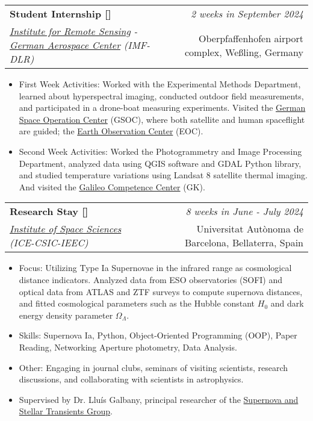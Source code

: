 \documentclass[a4paper,11pt]{article}
\makeatletter
\newcommand{\resumeSubheading}[4]{
\vspace{0.5mm}\item
    \begin{tabular*}{0.98\textwidth}[t]{l@{\extracolsep{\fill}}r}
        \textbf{#1} & \textit{\footnotesize{#4}} \\
        \textit{\footnotesize{#3}} &  \footnotesize{#2}\\
    \end{tabular*}
    \vspace{-2.4mm}
}
\newcommand{\resumeItemListStart}{\begin{itemize}[leftmargin=*,labelsep=1mm,itemsep=0.5mm]}
\newcommand{\resumeItemListEnd}{\end{itemize}\vspace{-2mm}}
\makeatother
\begin{document}
{  \resumeSubheading
      {{Student Internship [\href{https://github.com/joanalnu/thermal_analysis}{\faIcon{globe}}]}}{Oberpfaffenhofen airport complex, Weßling, Germany}
      {\href{https://www.dlr.de/de/eoc/ueber-uns/institut-fuer-methodik-der-fernerkundung}{Institute for Remote Sensing} - \href{https://dlr.de}{German Aerospace Center} (IMF-DLR)}{2 weeks in September 2024}
      \resumeItemListStart
        \item First Week Activities: Worked with the Experimental Methods Department, learned about hyperspectral imaging, conducted outdoor field measurements, and participated in a drone-boat measuring experiments. Visited the \href{https://www.dlr.de/en/rb}{German Space Operation Center} (GSOC), where both satellite and human spaceflight are guided; the \href{https://www.dlr.de/en/eoc}{Earth Observation Center} (EOC).
        \item Second Week Activities: Worked the Photogrammetry and Image Processing Department, analyzed data using QGIS software and GDAL Python library, and studied temperature variations using Landsat 8 satellite thermal imaging. And visited the \href{https://www.dlr.de/en/gk}{Galileo Competence Center} (GK).
      \resumeItemListEnd

    \resumeSubheading
      {{Research Stay [\href{https://drive.google.com/file/d/1j1Xh8nlbmBBZQ0Rd3fO6y1ergb93tsNu/view?usp=share_link}{\faIcon{globe}}]}}{Universitat Autònoma de Barcelona, Bellaterra, Spain}
      {\href{https://ice.csic.es}{Institute of Space Sciences} (ICE-CSIC-IEEC)}{8 weeks in June - July 2024}
      \resumeItemListStart
        \item Focus: Utilizing Type Ia Supernovae in the infrared range as cosmological distance indicators. Analyzed data from ESO observatories (SOFI) and optical data from ATLAS and ZTF surveys to compute supernova distances, and fitted cosmological parameters such as the Hubble constant $H_0$ and dark energy density parameter $\Omega_\Lambda$.
        \item Skills: Supernova Ia, Python, Object-Oriented Programming (OOP), Paper Reading, Networking Aperture photometry, Data Analysis.
        \item Other: Engaging in journal clubs, seminars of visiting scientists, research discussions, and collaborating with scientists in astrophysics.
        \item Supervised by Dr. Lluís Galbany, principal researcher of the \href{https://www.ice.csic.es/about-us/organisation?view=article&id=208&catid=2}{Supernova and Stellar Transients Group}.
      \resumeItemListEnd

}
\end{document}
